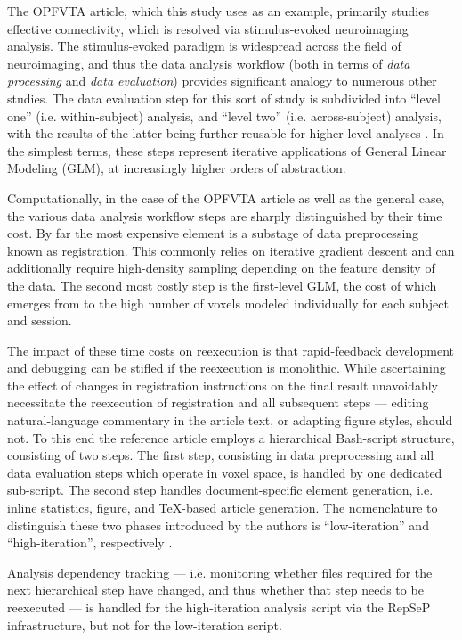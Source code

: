 The OPFVTA article, which this study uses as an example, primarily studies effective connectivity, which is resolved via stimulus-evoked neuroimaging analysis.
The stimulus-evoked paradigm is widespread across the field of neuroimaging, and thus the data analysis workflow (both in terms of \emph{data processing} and \emph{data evaluation}) provides significant analogy to numerous other studies.
The data evaluation step for this sort of study is subdivided into “level one” (i.e. within-subject) analysis, and “level two” (i.e. across-subject) analysis, with the results of the latter being further reusable for higher-level analyses \cite{Friston1995}.
In the simplest terms, these steps represent iterative applications of General Linear Modeling (GLM), at increasingly higher orders of abstraction.

Computationally, in the case of the OPFVTA article as well as the general case, the various data analysis workflow steps are sharply distinguished by their time cost.
By far the most expensive element is a substage of data preprocessing known as registration.
This commonly relies on iterative gradient descent and can additionally require high-density sampling depending on the feature density of the data.
The second most costly step is the first-level GLM, the cost of which emerges from to the high number of voxels modeled individually for each subject and session.

The impact of these time costs on reexecution is that rapid-feedback development and debugging can be stifled if the reexecution is monolithic.
While ascertaining the effect of changes in registration instructions on the final result unavoidably necessitate the reexecution of registration and all subsequent steps — editing natural-language commentary in the article text, or adapting figure styles, should not.
To this end the reference article employs a hierarchical Bash-script structure, consisting of two steps.
The first step, consisting in data preprocessing and all data evaluation steps which operate in voxel space, is handled by one dedicated sub-script.
The second step handles document-specific element generation, i.e. inline statistics, figure, and TeX-based article generation.
The nomenclature to distinguish these two phases introduced by the authors is “low-iteration” and “high-iteration”, respectively \cite{repsep}.

Analysis dependency tracking — i.e. monitoring whether files required for the next hierarchical step have changed, and thus whether that step needs to be reexecuted — is handled for the high-iteration analysis script via the RepSeP infrastructure, but not for the low-iteration script.


